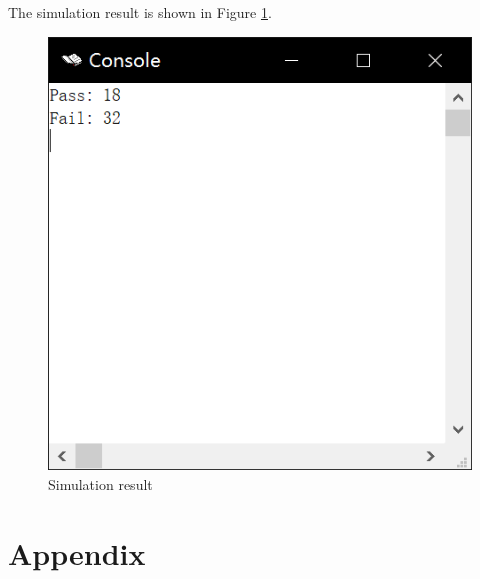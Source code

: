 \documentclass{article}
\begin{document}
The simulation result is shown in Figure \ref{fig-console}.

\begin{figure}[!htbp]
\centering
\includegraphics[width=0.5\linewidth]{console.png}
\caption{Simulation result}
\label{fig-console}
\end{figure}

\section{Appendix}
\inputminted{asm}{p1.s}
\end{document}
